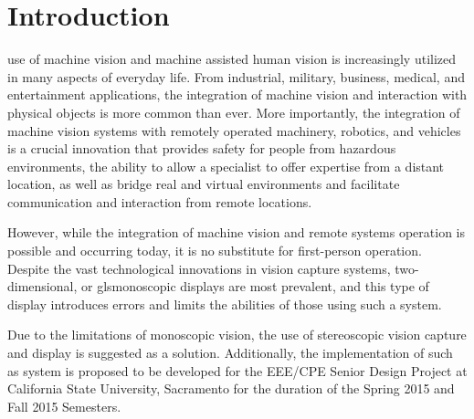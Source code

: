 \documentclass[12pt, journal]{IEEEtran}
\begin{document}



\section{Introduction}
 use of machine vision and machine assisted human vision is increasingly utilized in many aspects of everyday life.  From industrial, military, business, medical, and entertainment applications, the integration of machine vision and interaction with physical objects is more common than ever.  More importantly, the integration of machine vision systems with remotely operated machinery, robotics, and vehicles is a crucial innovation that provides safety for people from hazardous environments, the ability to allow a specialist to offer expertise from a distant location, as well as bridge real and virtual environments and facilitate communication and interaction from remote locations.

However, while the integration of machine vision and remote systems operation is possible and occurring today, it is no substitute for first-person operation.  Despite the vast technological innovations in vision capture systems, two-dimensional, or gls{monoscopic} displays are most prevalent, and this type of display introduces errors and limits the abilities of those using such a system.

Due to the limitations of monoscopic vision, the use of stereoscopic vision capture and display is suggested as a solution.  Additionally, the implementation of such as system is proposed to be developed for the EEE/CPE Senior Design Project at California State University, Sacramento for the duration of the Spring 2015 and Fall 2015 Semesters.
\end{document}
